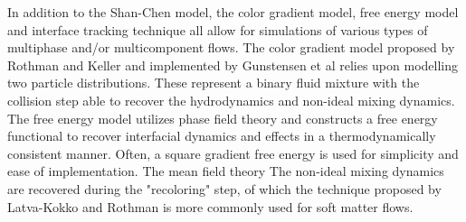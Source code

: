 In addition to the Shan-Chen model, the color gradient model, free energy model and interface tracking technique all 
allow for simulations of various types of multiphase and/or multicomponent flows. The color gradient model proposed by Rothman and Keller and 
implemented by Gunstensen et al relies upon modelling two particle distributions. These represent a binary fluid mixture with the collision step 
able to recover the hydrodynamics and non-ideal mixing dynamics. The free energy model utilizes phase field theory and constructs a free energy 
functional to recover interfacial dynamics and effects in a thermodynamically consistent manner. Often, a square gradient free energy is used for 
simplicity and ease of implementation. The mean field theory The non-ideal mixing dynamics are recovered during the "recoloring" step, of which the 
technique proposed by Latva-Kokko and Rothman is more commonly used for soft matter flows. \cite{liu_multiphase_2016}